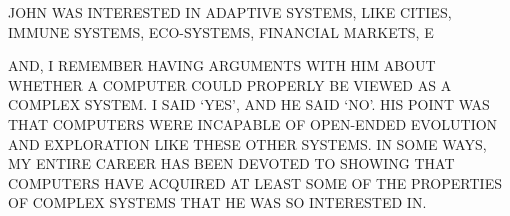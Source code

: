 








JOHN WAS INTERESTED IN ADAPTIVE SYSTEMS, LIKE CITIES, IMMUNE SYSTEMS, ECO-SYSTEMS, FINANCIAL MARKETS, E 

AND, I REMEMBER HAVING ARGUMENTS WITH HIM ABOUT WHETHER A COMPUTER COULD PROPERLY BE VIEWED AS A COMPLEX SYSTEM.  I SAID ‘YES’, AND HE SAID ‘NO’.   HIS POINT WAS THAT COMPUTERS WERE INCAPABLE OF OPEN-ENDED EVOLUTION AND EXPLORATION LIKE THESE OTHER SYSTEMS.   IN SOME WAYS, MY ENTIRE CAREER HAS BEEN DEVOTED TO SHOWING THAT COMPUTERS
HAVE ACQUIRED AT LEAST SOME OF THE PROPERTIES OF COMPLEX SYSTEMS THAT HE WAS SO INTERESTED IN.


